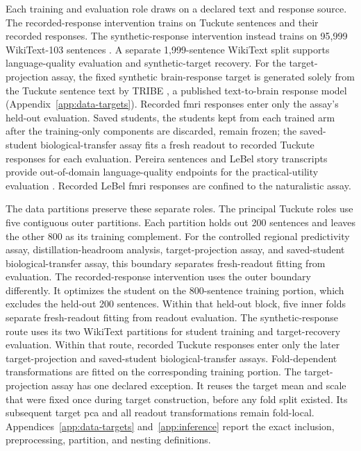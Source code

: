 Each training and evaluation role draws on a declared text and response source.
The recorded-response intervention trains on Tuckute sentences and their recorded responses.
The synthetic-response intervention instead trains on 95,999 WikiText-103 sentences \autocite{merity2017}.
A separate 1,999-sentence WikiText split supports language-quality evaluation and synthetic-target recovery.
For the target-projection assay, the fixed synthetic brain-response target is generated solely from the Tuckute sentence text by TRIBE \autocite{dascoli2026}, a published text-to-brain response model (Appendix~\ref{app:data-targets}).
Recorded \ac{fmri} responses enter only the assay's held-out evaluation.
Saved students, the students kept from each trained arm after the training-only components are discarded, remain frozen; the saved-student biological-transfer assay fits a fresh readout to recorded Tuckute responses for each evaluation.
Pereira sentences and LeBel story transcripts provide out-of-domain language-quality endpoints for the practical-utility evaluation \autocite{pereira2018,lebel2023}.
Recorded LeBel \ac{fmri} responses are confined to the naturalistic assay.

The data partitions preserve these separate roles.
The principal Tuckute roles use five contiguous outer partitions.
Each partition holds out 200 sentences and leaves the other 800 as its training complement.
For the controlled regional predictivity assay, distillation-headroom analysis, target-projection assay, and saved-student biological-transfer assay, this boundary separates fresh-readout fitting from evaluation.
The recorded-response intervention uses the outer boundary differently.
It optimizes the student on the 800-sentence training portion, which excludes the held-out 200 sentences.
Within that held-out block, five inner folds separate fresh-readout fitting from readout evaluation.
The synthetic-response route uses its two WikiText partitions for student training and target-recovery evaluation.
Within that route, recorded Tuckute responses enter only the later target-projection and saved-student biological-transfer assays.
Fold-dependent transformations are fitted on the corresponding training portion.
The target-projection assay has one declared exception.
It reuses the target mean and scale that were fixed once during target construction, before any fold split existed.
Its subsequent target \ac{pca} and all readout transformations remain fold-local.
Appendices~\ref{app:data-targets} and~\ref{app:inference} report the exact inclusion, preprocessing, partition, and nesting definitions.

